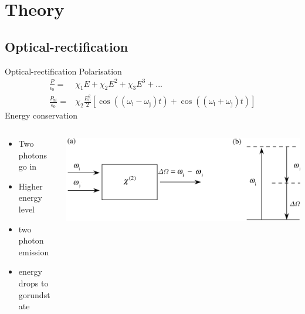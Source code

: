 \documentclass[aspectratio=1610, 9pt]{beamer}
\begin{document}
\section{Theory}
\subsection{Optical-rectification}
\begin{frame}{Optical-rectification}
 Polarisation
  \begin{align}
    \frac{P}{\epsilon_0} =& \chi_1E + \chi_2 E^2 + \chi_3 E^3 + ... \\
    \frac{P_\text{nl}}{\epsilon_0} =& \chi_2 \frac{E_0^2}{2} \left[ \cos((\omega_\text{i} - \omega_\text{j})t) + \cos((\omega_\text{i} + \omega_\text{j})t) \right ]
  \end{align}
  Energy conservation
  \begin{columns}
    \begin{column}{.4\textwidth}
      \begin{itemize}
        \item Two photons go in
        \item Higher energy level
        \item two photon emission 
        \item energy drops to gorundstate
      \end{itemize}
    \end{column}
    \begin{column}{.5\textwidth}
      \includegraphics[width=\textwidth]{images/diffrence_frequency_mixing.PNG}
    \end{column}
  \end{columns}
\end{frame}
\end{document}
